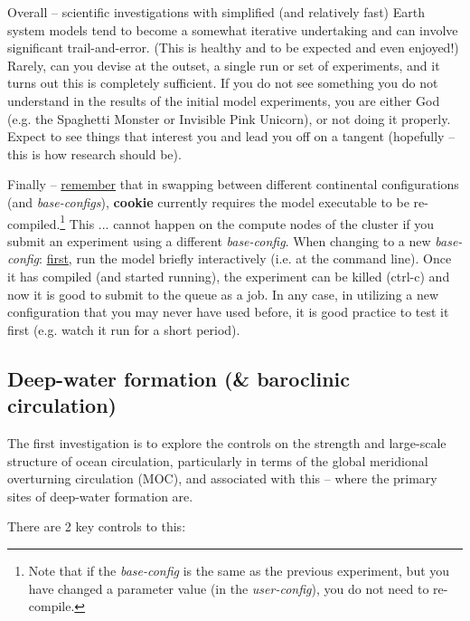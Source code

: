 \noindent Overall -- scientific investigations with simplified (and relatively fast) Earth system models tend to become a somewhat iterative undertaking and can involve significant trail-and-error. (This is healthy and to be expected and even enjoyed!) Rarely, can you devise at the outset, a single run or set of experiments, and it turns out this is completely sufficient. If you do not see something you do not understand in the results of the initial model experiments, you are either God (e.g. the Spaghetti Monster or Invisible Pink Unicorn), or not doing it properly. Expect to see things that interest you and lead you off on a tangent (hopefully -- this is how research should be).

\newpage

Finally -- \uline{remember} that in swapping between different continental configurations (and \textit{base-configs}), \textbf{cookie} currently requires the model executable to be  re-compiled.\footnote{Note that if the \textit{base-config} is the same as the previous experiment, but you have changed a parameter value (in the \textit{user-config}), you do not need to re-compile.} This ... cannot happen on the compute nodes of the cluster if you submit an experiment using a different \textit{base-config}. When changing to a new \textit{base-config}: \uline{first}, run the model briefly interactively (i.e. at the command line). Once it has compiled (and started running), the experiment can be killed (\textsf{\footnotesize ctrl-c}) and now it is good to submit to the queue as a job. In any case, in utilizing a new configuration that you may never have used before, it is good practice to test it first (e.g. watch it run for a short period).


\subsection{Deep-water formation (\& baroclinic circulation)}

The first investigation is to explore the controls on the strength and large-scale structure of ocean circulation, particularly in terms of the global meridional overturning circulation (MOC), and associated with this -- where the primary sites of deep-water formation are.

There are  2 key controls to this:

